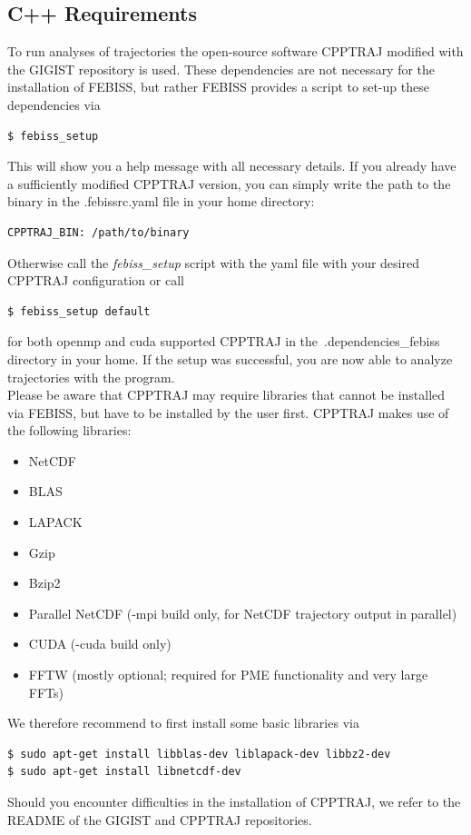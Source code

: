 \documentclass[12pt]{scrartcl} %
\begin{document}
\subsection{C++ Requirements}
To run analyses of trajectories the open-source software CPPTRAJ modified with the GIGIST repository is used. These dependencies are not necessary for the installation of FEBISS, but rather FEBISS provides a script to set-up these dependencies via
\begin{lstlisting}[language=bash]
$ febiss_setup
\end{lstlisting}
This will show you a help message with all necessary details. If you already have a sufficiently modified CPPTRAJ version, you can simply write the path to the binary in the .febissrc.yaml file in your home directory:
\begin{lstlisting}[language=bash]
CPPTRAJ_BIN: /path/to/binary
\end{lstlisting}
Otherwise call the \textit{febiss\_setup} script with the yaml file with your desired CPPTRAJ configuration or call
\begin{lstlisting}[language=bash]
$ febiss_setup default
\end{lstlisting}
for both openmp and cuda supported CPPTRAJ in the~.dependencies\_febiss directory in your home. If the setup was successful, you are now able to analyze trajectories with the program.\\
Please be aware that CPPTRAJ may require libraries that cannot be installed via FEBISS, but have to be installed by the user first. CPPTRAJ makes use of the following libraries:
\begin{itemize}
\item NetCDF
\item BLAS
\item LAPACK
\item Gzip
\item Bzip2
\item Parallel NetCDF (-mpi build only, for NetCDF trajectory output in parallel)
\item CUDA (-cuda build only)
\item FFTW (mostly optional; required for PME functionality and very large FFTs)
\end{itemize}
We therefore recommend to first install some basic libraries via
\begin{lstlisting}[language=bash]
$ sudo apt-get install libblas-dev liblapack-dev libbz2-dev
$ sudo apt-get install libnetcdf-dev
\end{lstlisting}
Should you encounter difficulties in the installation of CPPTRAJ, we refer to the README of the GIGIST and CPPTRAJ repositories.
\end{document}
